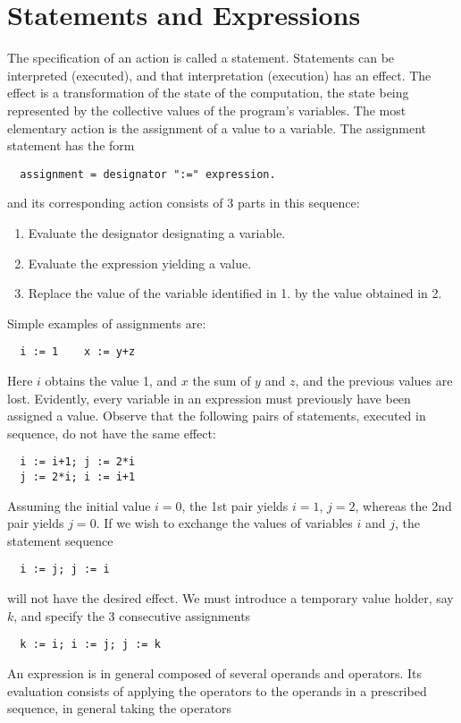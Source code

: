 \chapter{Statements and Expressions}
The specification of an action is called a statement. Statements can be interpreted (executed), and
that interpretation (execution) has an effect. The effect is a transformation of the state of the
computation, the state being represented by the collective values of the program's variables. The most
elementary action is the assignment of a value to a variable. The assignment statement has the form
\begin{verbatim}
  assignment = designator ":=" expression.
\end{verbatim}
and its corresponding action consists of 3 parts in this sequence:
\begin{enumerate}
  \item Evaluate the designator designating a variable.
  \item Evaluate the expression yielding a value.
  \item Replace the value of the variable identified in 1. by the value obtained in 2.
\end{enumerate}
Simple examples of assignments are:
\begin{verbatim}
  i := 1    x := y+z
\end{verbatim}
Here $i$ obtains the value 1, and $x$ the sum of $y$ and $z$, and the previous values are lost.
Evidently, every variable in an expression must previously have been assigned a value. Observe that
the following pairs of statements, executed in sequence, do not have the same effect:
\begin{verbatim}
  i := i+1; j := 2*i
  j := 2*i; i := i+1
\end{verbatim}
Assuming the initial value $i = 0$, the 1st pair yields $i = 1$, $j = 2$, whereas the 2nd pair yields
$j = 0$.  If we wish to exchange the values of variables $i$ and $j$, the statement sequence
\begin{verbatim}
  i := j; j := i
\end{verbatim}
will not have the desired effect. We must introduce a temporary value holder, say $k$, and specify
the 3 consecutive assignments
\begin{verbatim}
  k := i; i := j; j := k
\end{verbatim}
An expression is in general composed of several operands and operators. Its evaluation consists of
applying the operators to the operands in a prescribed sequence, in general taking the operators
